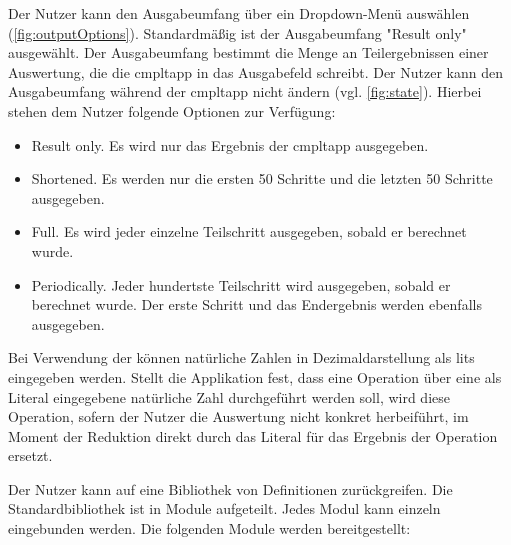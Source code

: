 \documentclass[parskip=full,11pt,twoside]{scrartcl}
\begin{document}
Der Nutzer kann den Ausgabeumfang über ein Dropdown-Menü auswählen (\cref{fig:outputOptions}). 
Standardmäßig ist der Ausgabeumfang "Result only" ausgewählt. 
Der Ausgabeumfang bestimmt die Menge an Teilergebnissen einer Auswertung, die die \gls{cmpltapp} in das Ausgabefeld schreibt.
Der Nutzer kann den Ausgabeumfang während der \gls{cmpltapp} nicht ändern (vgl. \cref{fig:state}).
Hierbei stehen dem Nutzer folgende Optionen zur Verfügung:
\begin{itemize}
	\item Result only. Es wird nur das Ergebnis der \gls{cmpltapp} ausgegeben.
	\item Shortened. Es werden nur die ersten 50 Schritte und die letzten 50 Schritte ausgegeben.
	\item Full. Es wird jeder einzelne Teilschritt ausgegeben, sobald er berechnet wurde.
	\item Periodically. Jeder hundertste Teilschritt wird ausgegeben, sobald er berechnet wurde. 
	Der erste Schritt und das Endergebnis werden ebenfalls ausgegeben.
\end{itemize}


Bei Verwendung der  können natürliche
Zahlen in Dezimaldarstellung als \glspl{lit} eingegeben werden.
Stellt die Applikation fest, dass eine Operation über eine als Literal
eingegebene natürliche Zahl durchgeführt werden soll, wird diese Operation, sofern
der Nutzer die Auswertung nicht konkret herbeiführt, im Moment der Reduktion direkt durch das Literal
für das Ergebnis der Operation ersetzt.

Der Nutzer kann auf eine Bibliothek von Definitionen zurückgreifen. Die Standardbibliothek
ist in Module aufgeteilt. Jedes Modul kann einzeln eingebunden werden. Die folgenden
Module werden bereitgestellt:
\end{document}
